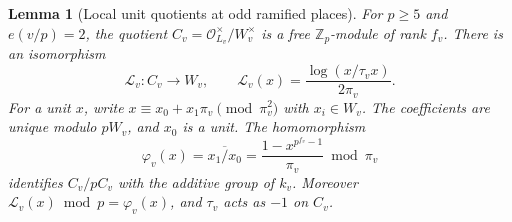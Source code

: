 \documentclass[11pt]{article}
\theoremstyle{plain}
\newtheorem{lemma}[theorem]{Lemma}
\theoremstyle{definition}
\theoremstyle{remark}
\newcommand{\Z}{\mathbb Z}
\newcommand{\OO}{\mathcal O}
\begin{document}
\begin{lemma}[Local unit quotients at odd ramified places]\label{lem:odd-layer}
For $p\ge5$ and $e(v/p)=2$, the quotient
$C_v=\OO_{L_v}^\times/W_v^\times$ is a free $\Z_p$-module of
rank $f_v$.  There is an isomorphism
\begin{equation}\label{eq:odd-log}
 \mathcal L_v:C_v\longrightarrow W_v,\qquad
 \mathcal L_v(x)=\frac{\log(x/\tau_vx)}{2\pi_v}.
\end{equation}
For a unit $x$, write
$x\equiv x_0+x_1\pi_v\pmod{\pi_v^2}$ with $x_i\in W_v$.
The coefficients are unique modulo $pW_v$, and $x_0$ is a unit.
The homomorphism
\begin{equation}\label{eq:first-layer}
 \varphi_v(x)=\overline{x_1/x_0}
      =\frac{1-x^{p^{f_v}-1}}{\pi_v}\bmod\pi_v
\end{equation}
identifies $C_v/pC_v$ with the additive group of $k_v$.
Moreover $\mathcal L_v(x)\bmod p=\varphi_v(x)$, and $\tau_v$ acts
as $-1$ on $C_v$.
\end{lemma}
\end{document}
